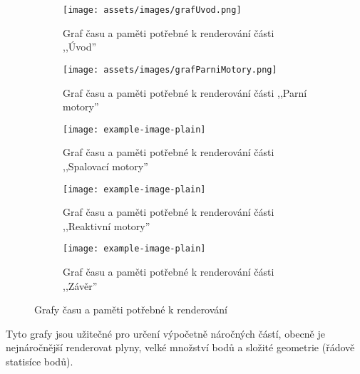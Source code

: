 \begin{figure}[H]
    \centering
    \begin{subfigure}{\textwidth}
        \centering
        \texttt{[image: assets/images/grafUvod.png]}
        \caption{Graf času a paměti potřebné k renderování části ,,Úvod'' \jaGraf}\vspace{0.25cm}
    \end{subfigure}
    \begin{subfigure}{\textwidth}
        \texttt{[image: assets/images/grafParniMotory.png]}
        \caption{Graf času a paměti potřebné k renderování části ,,Parní motory'' \jaGraf}\vspace{0.25cm}
    \end{subfigure}
    \begin{subfigure}{\textwidth}
        \texttt{[image: example-image-plain]}
        \caption{Graf času a paměti potřebné k renderování části ,,Spalovací motory'' \jaGraf}\vspace{0.25cm}
    \end{subfigure}
    \begin{subfigure}{\textwidth}
        \texttt{[image: example-image-plain]}
        \caption{Graf času a paměti potřebné k renderování části ,,Reaktivní motory'' \jaGraf}\vspace{0.25cm}
    \end{subfigure}
    \begin{subfigure}{\textwidth}
        \texttt{[image: example-image-plain]}
        \caption{Graf času a paměti potřebné k renderování části ,,Závěr'' \jaGraf}
    \end{subfigure}
    \caption{Grafy času a paměti potřebné k renderování}
    \label{obr:grafRender}
\end{figure}

{Tyto grafy jsou užitečné pro určení výpočetně náročných částí, obecně je nejnáročnější renderovat plyny, velké množství bodů a složité geometrie (řádově statisíce bodů).}





